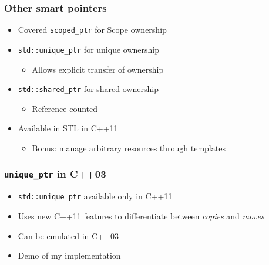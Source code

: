 



\begin{frame}[fragile]
    \frametitle{Other smart pointers}
    \begin{itemize}
        \item Covered \texttt{scoped\_ptr} for Scope ownership
        \item \texttt{std::unique\_ptr} for unique ownership
            \begin{itemize}
                \item Allows explicit transfer of ownership
            \end{itemize}
        \item \texttt{std::shared\_ptr} for shared ownership
            \begin{itemize}
                \item Reference counted
            \end{itemize}
        \item Available in STL in C++11
            \begin{itemize}
                \item Bonus: manage arbitrary resources through templates
            \end{itemize}
    \end{itemize}
\end{frame}

\begin{frame}[fragile]
    \frametitle{\texttt{unique\_ptr} in C++03}
    \begin{itemize}
        \item \texttt{std::unique\_ptr} available only in C++11
        \item Uses new C++11 features to differentiate between \emph{copies} and \emph{moves}
        \item Can be emulated in C++03
        \item Demo of my implementation
    \end{itemize}
\end{frame}




